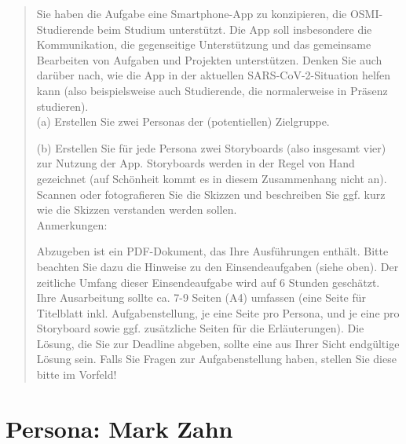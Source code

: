 \documentclass{article}
\begin{document}
\begin{quote}
	Sie haben die Aufgabe eine Smartphone-App zu konzipieren, die OSMI-Studierende beim Studium unterstützt.
	Die App soll insbesondere die Kommunikation, die gegenseitige Unterstützung und das gemeinsame Bearbeiten
	von Aufgaben und Projekten unterstützen. Denken Sie auch darüber nach, wie die App in der aktuellen
	SARS-CoV-2-Situation helfen kann (also beispielsweise auch Studierende, die normalerweise in Präsenz studieren).
	\\[1em]
	(a) Erstellen Sie zwei Personas der (potentiellen) Zielgruppe.

	(b) Erstellen Sie für jede Persona zwei Storyboards (also insgesamt vier) zur Nutzung der App. Storyboards
	werden in der Regel von Hand gezeichnet (auf Schönheit kommt es in diesem Zusammenhang nicht an). Scannen
	oder fotografieren Sie die Skizzen und beschreiben Sie ggf. kurz wie die Skizzen verstanden werden sollen.
	\\[1em]
	Anmerkungen:

	Abzugeben ist ein PDF-Dokument, das Ihre Ausführungen enthält. Bitte beachten Sie dazu die Hinweise zu den
	Einsendeaufgaben (siehe oben). Der zeitliche Umfang dieser Einsendeaufgabe wird auf 6 Stunden geschätzt.
	Ihre Ausarbeitung sollte ca. 7-9 Seiten (A4) umfassen (eine Seite für Titelblatt inkl. Aufgabenstellung,
	je eine Seite pro Persona, und je eine pro Storyboard sowie ggf. zusätzliche Seiten für die Erläuterungen).
	Die Lösung, die Sie zur Deadline abgeben, sollte eine aus Ihrer Sicht endgültige Lösung sein. Falls Sie
	Fragen zur Aufgabenstellung haben, stellen Sie diese bitte im Vorfeld!
\end{quote}

\newpage

\section{Persona: Mark Zahn}
\end{document}

